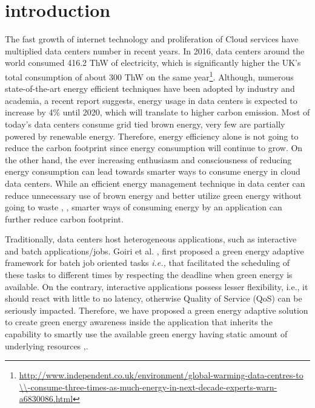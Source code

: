 \section{introduction}


The fast growth of internet technology and proliferation of Cloud services have multiplied data centers number in recent years. In 2016, data centers around the world consumed 416.2 ThW of electricity, which is significantly higher the UK's total consumption of about 300 ThW on the same year\footnote{\url{http://www.independent.co.uk/environment/global-warming-data-centres-to \\-consume-three-times-as-much-energy-in-next-decade-experts-warn-a6830086.html}}. Although, numerous state-of-the-art energy efficient techniques have been adopted by industry and academia, a recent report suggests, energy usage in data centers is expected to increase by 4\% until 2020, which will translate to higher carbon emission. Most of today's data centers consume grid tied brown energy, very few are partially powered by renewable energy. Therefore, energy efficiency alone is not going to reduce the
carbon footprint since energy consumption will continue to grow.
On the other hand, the ever increasing enthusiasm and consciousness of reducing energy consumption can lead towards smarter ways to consume energy in cloud data centers. While an efficient energy management technique in data center can reduce unnecessary use of brown energy and better utilize green energy without going to waste \cite{parasol}, \cite{sabbir}, smarter ways of consuming energy by an application can further reduce carbon footprint.

 


Traditionally, data centers host heterogeneous applications, such as interactive and batch applications/jobs. Goiri et al. \cite{GreenSlot}, \cite{GreenHadoop} first proposed a green energy adaptive framework for batch job oriented tasks \emph{i.e.,} that facilitated the scheduling of these tasks to different times by respecting the deadline when green energy is available. On the contrary, interactive
applications possess lesser flexibility, i.e., it should react with
little to no latency, otherwise Quality of Service (QoS) can
be seriously impacted. Therefore, we have proposed a green energy adaptive solution to create green energy awareness inside the application that inherits the capability to smartly use the available green energy having static amount of underlying resources \cite{cloudcom},\cite{tsc}.

